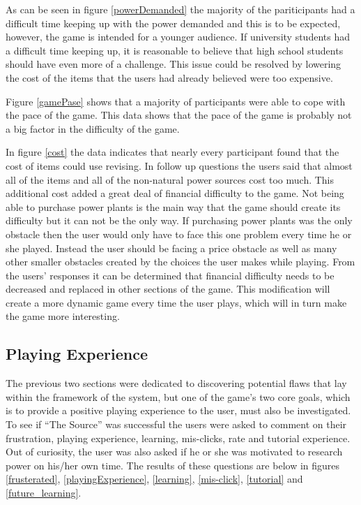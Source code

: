 \documentclass[msc,oneside]{ubcthesis}%
\begin{document}
As can be seen in figure \ref{powerDemanded} the majority of the pariticipants had a difficult time keeping up with the power demanded and this is to be expected, however, the game is intended for a younger audience. If university students had a difficult time keeping up, it is reasonable to believe that high school students should have even more of a challenge. This issue could be resolved by lowering the cost of the items that the users had already believed were too expensive.

Figure \ref{gamePase} shows that a majority of participants were able to cope with the pace of the game. This data shows that the pace of the game is probably not a big factor in the difficulty of the game. 

\newpage
In figure \ref{cost} the data indicates that nearly every participant found that the cost of items could use revising. In follow up questions the users said that almost all of the items and all of the non-natural power sources cost too much. This additional cost added a great deal of financial difficulty to the game. Not being able to purchase power plants is the main way that the game should create its difficulty but it can not be the only way. If purchasing power plants was the only obstacle then the user would only have to face this one problem every time he or she played. Instead the user should be facing a price obstacle as well as many other smaller obstacles created by the choices the user makes while playing. From the users' responses it can be determined that financial difficulty needs to be decreased and replaced in other sections of the game. This modification will create a more dynamic game every time the user plays, which will in turn make the game more interesting.


\subsection{Playing Experience}
\indent The previous two sections were dedicated to discovering potential flaws that lay within the framework of the system, but one of the game's two core goals, which is to provide a positive playing experience to the user, must also be investigated. To see if ``The Source'' was successful the users were asked to comment on their frustration, playing experience, learning, mis-clicks, rate and tutorial experience. Out of curiosity, the user was also asked if he or she was motivated to research power on his/her own time. The results of these questions are below in figures \ref{frusterated}, \ref{playingExperience}, \ref{learning}, \ref{mis-click}, \ref{tutorial} and \ref{future_learning}. 
\end{document}
